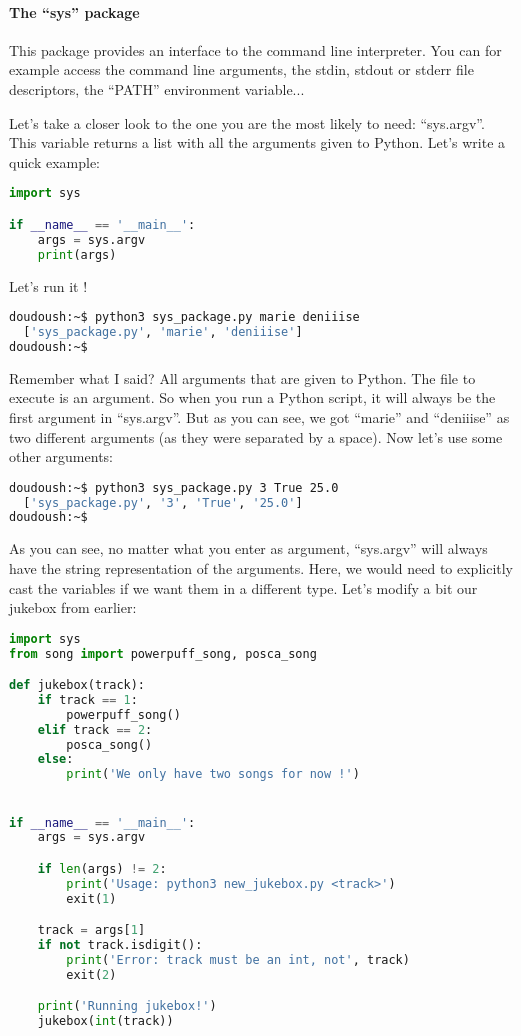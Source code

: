 \paragraph{The ``sys'' package}

This package provides an interface to the command line interpreter. You can
for example access the command line arguments, the stdin, stdout or stderr
file descriptors, the ``PATH'' environment variable...

\vspace{5mm}

Let's take a closer look to the one you are the most likely to need: ``sys.argv''.
This variable returns a list with all the arguments given to Python.
Let's write a quick example:

\begin{lstlisting}[language=python]
import sys

if __name__ == '__main__':
    args = sys.argv
    print(args)
\end{lstlisting}

Let's run it !

\begin{lstlisting}[language=bash]
doudoush:~$ python3 sys_package.py marie deniiise
  ['sys_package.py', 'marie', 'deniiise']
doudoush:~$
\end{lstlisting}

Remember what I said? All arguments that are given to Python. The file to execute
is an argument. So when you run a Python script, it will always be the first argument
in ``sys.argv''. But as you can see, we got ``marie'' and ``deniiise'' as two different
arguments (as they were separated by a space). Now let's use some other arguments:

\begin{lstlisting}[language=bash]
doudoush:~$ python3 sys_package.py 3 True 25.0
  ['sys_package.py', '3', 'True', '25.0']
doudoush:~$
\end{lstlisting}

As you can see, no matter what you enter as argument, ``sys.argv'' will always
have the string representation of the arguments. Here, we would need to explicitly
cast the variables if we want them in a different type. Let's modify a bit our
jukebox from earlier:

\begin{lstlisting}[language=python]
import sys
from song import powerpuff_song, posca_song

def jukebox(track):
    if track == 1:
        powerpuff_song()
    elif track == 2:
        posca_song()
    else:
        print('We only have two songs for now !')


if __name__ == '__main__':
    args = sys.argv

    if len(args) != 2:
        print('Usage: python3 new_jukebox.py <track>')
        exit(1)

    track = args[1]
    if not track.isdigit():
        print('Error: track must be an int, not', track)
        exit(2)

    print('Running jukebox!')
    jukebox(int(track))
\end{lstlisting}

